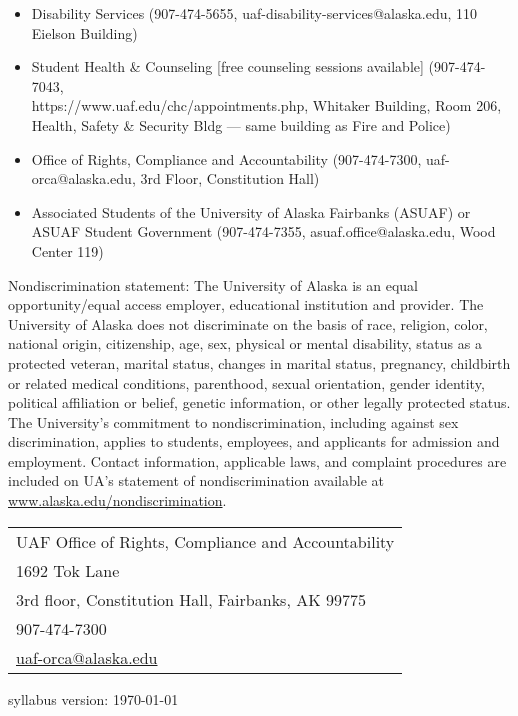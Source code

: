 \documentclass[12pt]{article}
\begin{document}
    \begin{itemize}
    \setlength\itemsep{0em}
    \item Disability Services (907-474-5655, {uaf-disability-services@alaska.edu}, 110 Eielson Building)
    \item Student Health \& Counseling [free counseling sessions available] (907-474-7043,\\{https://www.uaf.edu/chc/appointments.php}, Whitaker Building, Room 206, Health, Safety \& Security Bldg --- same building as Fire and Police)
    \item Office of Rights, Compliance and Accountability (907-474-7300, {uaf-orca@alaska.edu}, 3rd Floor, Constitution Hall)
    \item Associated Students of the University of Alaska Fairbanks (ASUAF) or ASUAF Student Government (907-474-7355, {asuaf.office@alaska.edu}, Wood Center 119)
    \end{itemize}
    
    Nondiscrimination statement: The University of Alaska is an equal opportunity/equal access employer, educational institution and provider. The University of Alaska does not discriminate on the basis of race, religion, color, national origin, citizenship, age, sex, physical or mental disability, status as a protected veteran, marital status, changes in marital status, pregnancy, childbirth or related medical conditions, parenthood, sexual orientation, gender identity, political affiliation or belief, genetic information, or other legally protected status. The University's commitment to nondiscrimination, including against sex discrimination, applies to students, employees, and applicants for admission and employment. Contact information, applicable laws, and complaint procedures are included on UA's statement of nondiscrimination available at \url{www.alaska.edu/nondiscrimination}.
    
    \begin{tabular}{l}
    UAF Office of Rights, Compliance and Accountability\\
    1692 Tok Lane\\
    3rd floor, Constitution Hall, Fairbanks, AK 99775\\
    907-474-7300\\
    \url{uaf-orca@alaska.edu}
    \end{tabular}

\vfill
\hfill \scriptsize syllabus version: \today \normalsize
\end{document}
